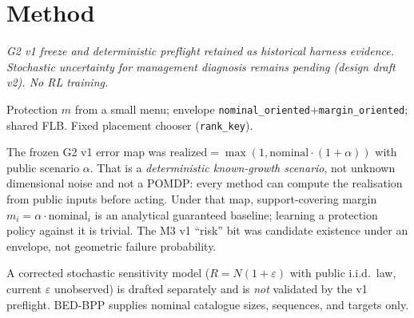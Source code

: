 \section{Method}

\textit{G2 v1 freeze and deterministic preflight retained as historical harness
evidence. Stochastic uncertainty for management diagnosis remains pending
(design draft v2). No RL training.}

Protection $m$ from a small menu; envelope
\texttt{nominal\_oriented}+\texttt{margin\_oriented}; shared FLB.
Fixed placement chooser (\texttt{rank\_key}).

The frozen G2 v1 error map was
$\mathrm{realized}=\max(1,\mathrm{nominal}\cdot(1+\alpha))$ with public
scenario $\alpha$. That is a \emph{deterministic known-growth scenario}, not
unknown dimensional noise and not a POMDP: every method can compute the
realisation from public inputs before acting. Under that map, support-covering
margin $m_i=\alpha\cdot\mathrm{nominal}_i$ is an analytical guaranteed baseline;
learning a protection policy against it is trivial. The M3 v1 ``risk'' bit was
candidate existence under an envelope, not geometric failure probability.

A corrected stochastic sensitivity model
($R=N(1+\varepsilon)$ with public i.i.d.\ law, current $\varepsilon$ unobserved)
is drafted separately and is \emph{not} validated by the v1 preflight. BED-BPP
supplies nominal catalogue sizes, sequences, and targets only.
